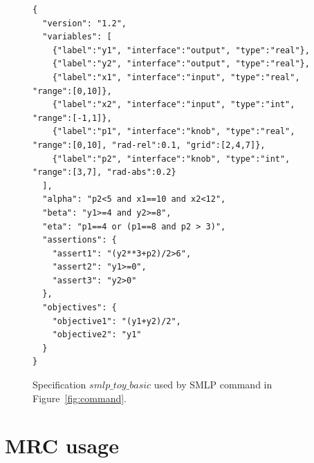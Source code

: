 \documentclass[a4paper,parskip=half]{article} %
\begin{document}
\begin{figure}%
\small
\begin{verbatim}
{
  "version": "1.2",
  "variables": [
    {"label":"y1", "interface":"output", "type":"real"},
    {"label":"y2", "interface":"output", "type":"real"},
    {"label":"x1", "interface":"input", "type":"real", "range":[0,10]},
    {"label":"x2", "interface":"input", "type":"int", "range":[-1,1]},
    {"label":"p1", "interface":"knob", "type":"real", "range":[0,10], "rad-rel":0.1, "grid":[2,4,7]},
    {"label":"p2", "interface":"knob", "type":"int", "range":[3,7], "rad-abs":0.2}
  ],
  "alpha": "p2<5 and x1==10 and x2<12",
  "beta": "y1>=4 and y2>=8",
  "eta": "p1==4 or (p1==8 and p2 > 3)",
  "assertions": {
    "assert1": "(y2**3+p2)/2>6",
    "assert2": "y1>=0",
    "assert3": "y2>0"
  },
  "objectives": {
    "objective1": "(y1+y2)/2",
    "objective2": "y1"
  }
}
\end{verbatim}
\vspace*{-1\baselineskip}
\caption{Specification $smlp\_toy\_basic$ used by SMLP command in Figure~\cref{fig:command}.}
\label{fig:spec}
\end{figure}







\section{MRC usage}\label{sec:mrc}
\end{document}
